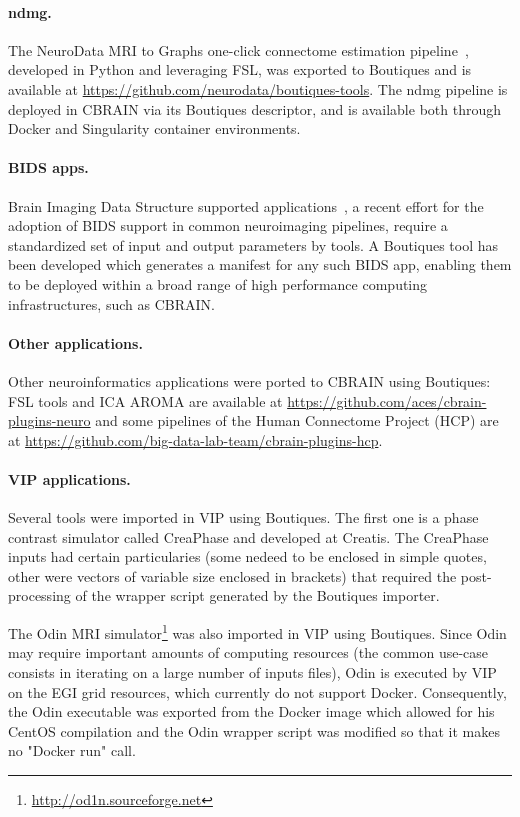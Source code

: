 \documentclass{article}
\newcommand{\boutiques}{Boutiques\xspace}
\begin{document}
\paragraph{ndmg.} The NeuroData MRI to Graphs one-click connectome estimation
pipeline~\cite{kiar2017comprehensive}, developed in Python and leveraging FSL, was
exported to \boutiques and is available at \url{https://github.com/neurodata/boutiques-tools}.
The ndmg pipeline is deployed in CBRAIN via its \boutiques descriptor, and is available
both through Docker and Singularity container environments.

\paragraph{BIDS apps.} Brain Imaging Data Structure supported
applications~\cite{gorgolewski2017bids}, a recent effort for the adoption of BIDS support
in common neuroimaging pipelines, require a standardized set of input and output parameters
by tools. A \boutiques tool has been developed which generates a manifest for any such
BIDS app, enabling them to be deployed within a broad range of high performance computing
infrastructures, such as CBRAIN.

\paragraph{Other applications.} Other neuroinformatics applications were ported to CBRAIN using \boutiques:
FSL tools and ICA AROMA are available at
\url{https://github.com/aces/cbrain-plugins-neuro} and some pipelines
of the Human Connectome Project (HCP) are at
\url{https://github.com/big-data-lab-team/cbrain-plugins-hcp}.

\paragraph{VIP applications.} Several tools were imported in VIP using \boutiques. 
The first one is a phase contrast simulator called CreaPhase and developed at Creatis. 
The CreaPhase inputs had certain particularies (some nedeed to be enclosed 
in simple quotes, other were vectors of variable size enclosed in brackets)
that required the post-processing of the wrapper script generated by the
Boutiques importer. 

The Odin MRI simulator\footnote{\url{http://od1n.sourceforge.net}} was also imported 
in VIP using \boutiques. Since Odin  may require important amounts of computing resources 
(the common use-case consists in iterating on a large number of inputs files), Odin is 
executed by VIP on the EGI grid resources, which currently do not support Docker. Consequently, 
the Odin executable was exported from the Docker image which allowed for his CentOS compilation
and the Odin wrapper script was modified so that it makes no "Docker run" call.
\end{document}
